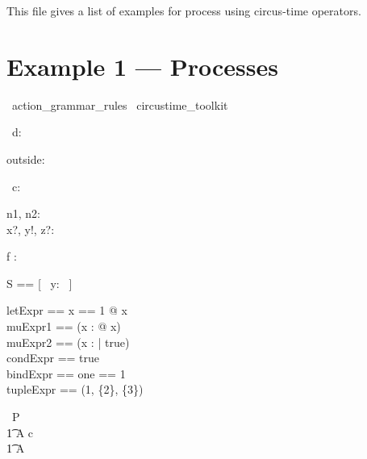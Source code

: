 \documentclass{article}
\begin{document}
This file gives a list of examples for process using circus-time operators.   

\section{Example 1 --- Processes}

\begin{zsection}
  \SECTION\ action\_grammar\_rules \parents\ circustime\_toolkit
\end{zsection}

\begin{circus}
     \circchannel\ d: \nat \\
\end{circus}

\begin{axdef}
    outside: \nat
\end{axdef}

\begin{circus}
   \circchannel\ c: \nat \cross \nat \cross \nat \cross \nat
\end{circus}

\begin{axdef}
   n1, n2: \nat \\
   x?, y!, z?: \nat
\end{axdef}

\begin{axdef}
   f : \nat \fun \nat \cross \nat
\end{axdef}

\begin{zed}
   S == [~ y: \nat ~]
\end{zed}

\begin{zed}
  letExpr == \LET x == 1 @ x\\
  muExpr1 == (\mu x : \nat @ x)\\
  muExpr2 == (\mu x : \nat | true)\\
  condExpr == \IF true  \\
  bindExpr == \lblot one == 1 \rblot\\
  tupleExpr == (1, \{2\}, \power \{3\})\\
\end{zed}

\begin{circus}
    \circprocess\ P \circdef  \circbegin  \\
    \t1 A \circdef c \then \Skip \\
    \t1 \circspot A \\
    \circend
\end{circus}
\end{document}
